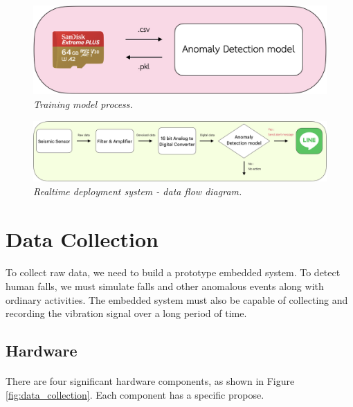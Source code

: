 \begin{figure}[H]
  \centering
  \caption[Training model process.]{\emph{Training model process.}}\label{fig:training}
  \includegraphics[scale = 0.2]{figures/meth_training.jpg}  
\end{figure}

\begin{figure}[H]
  \centering
  \caption[Realtime deployment system - data flow diagram.]{\emph{Realtime deployment system - data flow diagram.}}\label{fig:deploy_data_flow}
  \includegraphics[scale = 0.13]{figures/meth_deploy.jpg}  
\end{figure}




\section{Data Collection}
\paragraph{}
To collect raw data, we need to build a prototype embedded system. To detect human falls, we must simulate falls and other anomalous events along with ordinary activities. The embedded system must also be capable of collecting and recording the vibration signal over a long period of time.

\subsection{Hardware}
\paragraph{}
There are four significant hardware components, as shown in Figure \ref{fig:data_collection}. Each component has a specific propose.
    
